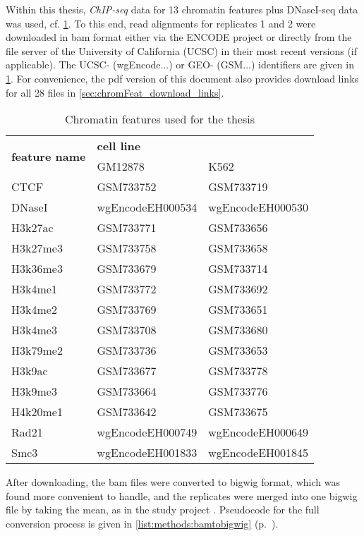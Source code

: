 Within this thesis, \emph{ChIP-seq} data for 13 chromatin features plus DNaseI-seq data was used, cf. \cref{tab:methods:csdata}.
To this end, read alignments for replicates 1 and 2 were downloaded in bam format either via the ENCODE project \cite{Encode2012,Davis2017} 
or directly from the file server of the University of California (UCSC) in their most recent versions (if applicable).
The UCSC- (wgEncode...) or GEO- (GSM...) identifiers are given in \cref{tab:methods:csdata}.
For convenience, the pdf version of this document also provides download links for all 28 files in \cref{sec:chromFeat_download_links}.
\begin{table}[ht!]
\centering
 \begin{tabular}{lll}
 \hline
  \multicolumn{1}{c}{\multirow{2}{*}{\textbf{feature name}}} & \multicolumn{2}{l}{\hspace*{18mm}\textbf{cell line}} \\
\multicolumn{1}{c}{}                                       & GM12878             & K562             \\ \hline
  CTCF & GSM733752 & GSM733719\\
  DNaseI & wgEncodeEH000534 & wgEncodeEH000530\\
  H3k27ac & GSM733771 & GSM733656\\
  H3k27me3 &GSM733758 & GSM733658\\
  H3k36me3 &GSM733679 & GSM733714\\
  H3k4me1  &GSM733772 & GSM733692\\
  H3k4me2  &GSM733769 & GSM733651\\
  H3k4me3 &GSM733708 & GSM733680\\
  H3k79me2 &GSM733736	& GSM733653	\\
  H3k9ac &GSM733677 & GSM733778\\
  H3k9me3 &GSM733664 & GSM733776	\\
  H4k20me1 &GSM733642 & GSM733675\\
  Rad21 &	wgEncodeEH000749 & wgEncodeEH000649\\
  Smc3 & 	wgEncodeEH001833 & wgEncodeEH001845\\ \hline
 \end{tabular}
 \caption{Chromatin features used for the thesis} \label{tab:methods:csdata}
\end{table}
After downloading, the bam files were converted to bigwig format, which was found more convenient to handle, and the replicates were merged into 
one bigwig file by taking the mean, as in the study project \cite{Krauth2020}. 
Pseudocode for the full conversion process is given in \cref{list:methods:bamtobigwig} (p.~\pageref{list:methods:bamtobigwig}).


